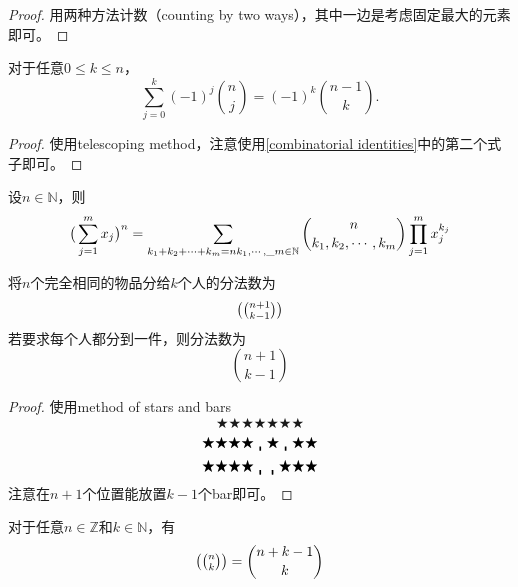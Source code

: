 \begin{proof}
	用两种方法计数（counting by two ways），其中一边是考虑固定最大的元素即可。
\end{proof}
\begin{proposition}
	对于任意$0\leq k\leq n$，
	\begin{equation*}
		\sum\limits_{j=0}^k (-1)^j \binom{n}{j} = (-1)^k\binom{n-1}{k}.
	\end{equation*}
\end{proposition}
\begin{proof}
	使用telescoping method，注意使用\ref{combinatorial identities}中的第二个式子即可。
\end{proof}
\begin{theorem}
	设$n\in \mathbb{N}$，则
	\begin{equation*}
		\big(\sum\limits_{j=1}^mx_j\big)^n = \sum\limits_{k_1+k_2+\cdots+k_m=n\newline k_1, \cdots,\_m\in \mathbb{N}}\binom{n}{k_1, k_2,\cdots, k_m}\prod\limits_{j=1}^m x_j^{k_j}
	\end{equation*}
\end{theorem}
\begin{proposition}
	将$n$个完全相同的物品分给$k$个人的分法数为
	\begin{equation*}
		\big(\tbinom{n+1}{k-1}\big)
	\end{equation*}
	若要求每个人都分到一件，则分法数为
	\begin{equation*}
		\binom{n+1}{k-1}
	\end{equation*}
\end{proposition}
\begin{proof}
	使用method of stars and bars
	\begin{equation*}
		\bigstar \bigstar \bigstar \bigstar \bigstar \bigstar \bigstar
	\end{equation*}
	\begin{equation*}
		\bigstar \bigstar \bigstar \bigstar \bracevert \bigstar \bracevert \bigstar \bigstar
	\end{equation*}
	\begin{equation*}
		\bigstar \bigstar \bigstar \bigstar \bracevert \bracevert \bigstar \bigstar \bigstar
	\end{equation*}
	注意在$n+1$个位置能放置$k-1$个bar即可。
\end{proof}
\begin{theorem}
	对于任意$n\in\mathbb Z$和$k\in \mathbb N$，有
	\begin{equation*}
		\big(\tbinom{n}{k}\big) = \binom{n+k-1}{k}
	\end{equation*}
\end{theorem}
